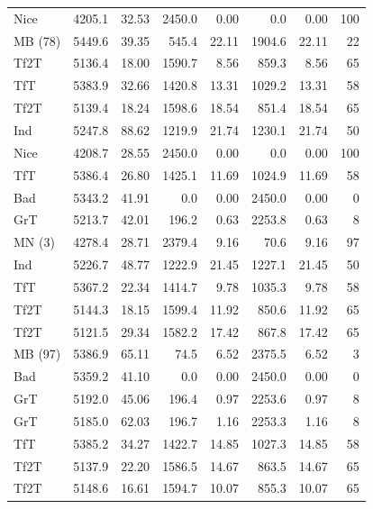 \documentclass[journal,a4paper,10pt,twoside]{IEEEtran} %
\begin{document}
\begin{table}[ht]
\begin{tabular}{lrrrrrrr}
    	    Nice &   4205.1 & 32.53 &   2450.0 &  0.00 &      0.0 &  0.00 &   100 \\
    	 MB (78) &   5449.6 & 39.35 &    545.4 & 22.11 &   1904.6 & 22.11 &    22 \\
    	    Tf2T &   5136.4 & 18.00 &   1590.7 &  8.56 &    859.3 &  8.56 &    65 \\
    	     TfT &   5383.9 & 32.66 &   1420.8 & 13.31 &   1029.2 & 13.31 &    58 \\
    	    Tf2T &   5139.4 & 18.24 &   1598.6 & 18.54 &    851.4 & 18.54 &    65 \\
    	     Ind &   5247.8 & 88.62 &   1219.9 & 21.74 &   1230.1 & 21.74 &    50 \\
    	    Nice &   4208.7 & 28.55 &   2450.0 &  0.00 &      0.0 &  0.00 &   100 \\
    	     TfT &   5386.4 & 26.80 &   1425.1 & 11.69 &   1024.9 & 11.69 &    58 \\
    	     Bad &   5343.2 & 41.91 &      0.0 &  0.00 &   2450.0 &  0.00 &     0 \\
    	     GrT &   5213.7 & 42.01 &    196.2 &  0.63 &   2253.8 &  0.63 &     8 \\
    	  MN (3) &   4278.4 & 28.71 &   2379.4 &  9.16 &     70.6 &  9.16 &    97 \\
    	     Ind &   5226.7 & 48.77 &   1222.9 & 21.45 &   1227.1 & 21.45 &    50 \\
    	     TfT &   5367.2 & 22.34 &   1414.7 &  9.78 &   1035.3 &  9.78 &    58 \\
    	    Tf2T &   5144.3 & 18.15 &   1599.4 & 11.92 &    850.6 & 11.92 &    65 \\
    	    Tf2T &   5121.5 & 29.34 &   1582.2 & 17.42 &    867.8 & 17.42 &    65 \\
    	 MB (97) &   5386.9 & 65.11 &     74.5 &  6.52 &   2375.5 &  6.52 &     3 \\
    	     Bad &   5359.2 & 41.10 &      0.0 &  0.00 &   2450.0 &  0.00 &     0 \\
    	     GrT &   5192.0 & 45.06 &    196.4 &  0.97 &   2253.6 &  0.97 &     8 \\
    	     GrT &   5185.0 & 62.03 &    196.7 &  1.16 &   2253.3 &  1.16 &     8 \\
    	     TfT &   5385.2 & 34.27 &   1422.7 & 14.85 &   1027.3 & 14.85 &    58 \\
    	    Tf2T &   5137.9 & 22.20 &   1586.5 & 14.67 &    863.5 & 14.67 &    65 \\
    	    Tf2T &   5148.6 & 16.61 &   1594.7 & 10.07 &    855.3 & 10.07 &    65 \\

\end{tabular}
\end{table}
\end{document}
